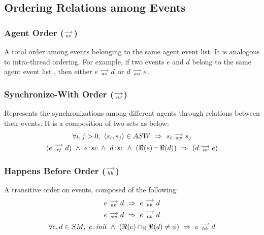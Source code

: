         \subsection{Ordering Relations among Events}
        
        \subsubsection{Agent Order ($\stackrel{\longrightarrow}{_\textit{ao}}$)}
            A total order among events belonging to the same agent event list. It is analogous to intra-thread ordering. For example, if two events $e$ and $d$ belong to the same agent event list , then either $e\stackrel{\longrightarrow}{_{\textit{\textit{ao}}}}d$ or $d\stackrel{\longrightarrow}{_{\textit{\textit{ao}}}}e$. 
            
        
        \subsubsection{Synchronize-With Order ($\stackrel{\longrightarrow}{_\textit{sw}} $)}
           Represents the synchronizations among different agents through relations between their events. It is a composition of two sets as below: 
                \begin{gather*}
                            \forall{i, j > 0}, \ \langle s_i, s_j \rangle \in ASW\ \Rightarrow{}\ s_i \stck{_\textit{sw}} s_j 
                            \\
                            (\reln{e}{rf}{d}) \ \wedge \ \et{e}{sc} \ \wedge \ \et{d}{sc} \ \wedge \ (\Re(e)\!=\!\Re(d)) \ \Rightarrow{} \ (d \stck{_\textit{sw}} e)
                \end{gather*}
  
        \subsubsection{Happens Before Order ($\stackrel{\longrightarrow}{_\textit{hb}}$)}
            A transitive order on events, composed of the following:
                \begin{gather*}
                    \reln{e}{ao}{d} \ \Rightarrow{} \ \reln{e}{hb}{d}
                    \\
                    \reln{e}{sw}{d} \ \Rightarrow{} \ \reln{e}{hb}{d}
                    \\
                    \forall e, d \in SM,\ 
                    \et{e}{init} \ \wedge \ 
                    (\Re(e) \cap_\Re \Re(d) \neq \phi)
                    \ \Rightarrow{} \ 
                    \reln{e}{hb}{d}
                \end{gather*}
        
